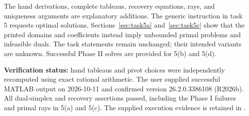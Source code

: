\documentclass[11pt,a4paper]{article}
\begin{document}
The hand derivations, complete tableaus, recovery equations, rays, and uniqueness
arguments are explanatory additions. The generic instruction in task 5 requests
optimal solutions. Sections~\ref{sec:task5a} and~\ref{sec:task5c} show that the
printed domains and coefficients instead imply unbounded primal problems and
infeasible duals. The task statements remain unchanged; their intended variants
are unknown. Successful Phase II solves are provided for 5(b) and 5(d).

\textbf{Verification status:} hand tableaus and pivot choices were independently
recomputed using exact rational arithmetic. The user supplied successful MATLAB
output on 2026-10-11 and confirmed version 26.2.0.3386108 (R2026b).
All dual-simplex and recovery assertions passed, including the Phase I failures
and primal rays in 5(a) and 5(c). The supplied execution evidence is retained
in .
\end{document}
